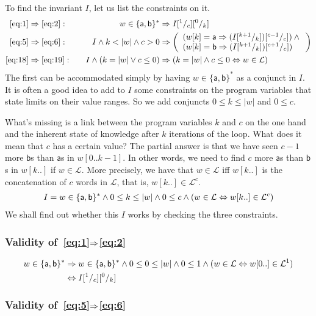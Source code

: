 \documentclass[a4paper]{scrartcl}
\newcommand{\ah}{\mathsf{a}}
\newcommand{\be}{\mathsf{b}}
\def\L{\mathcal{L}}
\begin{document}
To find the invariant $I$, let us list the constraints on it.
\begin{align*}
  \eqref{eq:1}&\Implies\eqref{eq:2}: &&& w\in\{\ah,\be\}^*&\Implies I\subst 1c\subst 0k\\
  \eqref{eq:5}&\Implies\eqref{eq:6}: &&& I\And k < |w|\And c > 0 &\Implies \left(
    \begin{array}[c]{l}
      (w[k]=\ah \Implies (I\subst{k+1}k)\subst{c-1}c)\And{}\\
      (w[k]=\be \Implies (I\subst{k+1}k)\subst{c+1}c)
    \end{array}
  \right)\\
  \eqref{eq:18}&\Implies\eqref{eq:19}: &&& I\And (k = |w|\Or c \leq 0) &\Implies (k=|w|\And c \leq 0\Equiv w\in \L)
\end{align*}
The first can be accommodated simply by having $w\in\{\ah,\be\}^*$ as
a conjunct in $I$. It is often a good idea to add to $I$ some
constraints on the program variables that state limits on their value
ranges. So we add conjuncts $0\leq k\leq|w|$ and $0\leq c$.

What's missing is a link between the program variables $k$ and $c$ on
the one hand and the inherent state of knowledge after $k$ iterations
of the loop. What does it mean that $c$ has a certain value? The
partial answer is that we have seen $c-1$ more $\be$s than $\ah$s in
$w[0..k-1]$. In other words, we need to find $c$ more $\ah$s than
$\be$s in $w[k..]$ if $w\in\L$. More precisely, we have that $w\in\L$
iff $w[k..]$ is the concatenation of $c$ words in $\L$, that is,
$w[k..]\in\L^c$.
\begin{gather*}
  I = w\in\{\ah,\be\}^* \And 0\leq k\leq|w| \And 0\leq c\And (w\in\L\Equiv w[k..]\in\L^c)
\end{gather*}
We shall find out whether this $I$ works by checking the three constraints.

\subsubsection{Validity of~\eqref{eq:1}$\Rightarrow$\eqref{eq:2}}
\label{sec:valid-eqref}
\begin{align*}
  w\in\{\ah,\be\}^*
  &\Implies
  w\in\{\ah,\be\}^* \And 0\leq 0\leq|w| \And 0\leq 1\And (w\in\L\Equiv w[0..]\in\L^1)\\
  &\Equiv
  I\subst 1c\subst 0k
\end{align*}

\subsubsection{Validity of~\eqref{eq:5}$\Rightarrow$\eqref{eq:6}}
\label{sec:valid-eqref-1}
\end{document}
